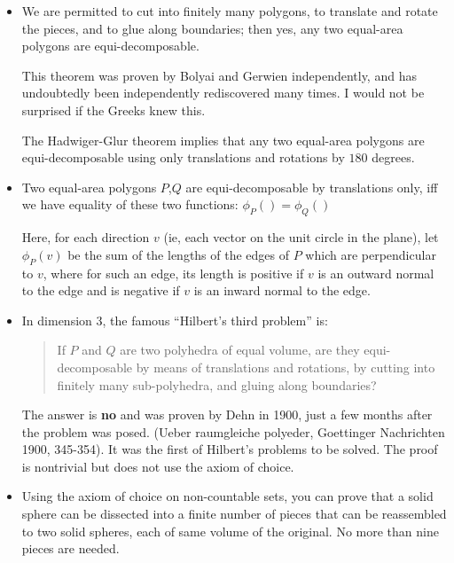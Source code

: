 \begin{itemize}
  \item We are permitted to cut into finitely many polygons, to
  translate and rotate the pieces, and to glue along boundaries; then
  yes, any two equal-area polygons are equi-decomposable.

  This theorem was proven by Bolyai and Gerwien independently, and has
  undoubtedly been independently rediscovered many times.  I would not
  be surprised if the Greeks knew this.

  The Hadwiger-Glur theorem implies that any two equal-area polygons are
  equi-decomposable using only translations and rotations by $180$
  degrees.

  \item
  \begin{teo}
    Two equal-area polygons $P$,$Q$ are equi-decomposable by
    translations only, iff we have equality of these two functions:
    $\phi_P() = \phi_Q()$
  \end{teo}
  Here, for each direction $v$ (ie, each vector on the unit circle in
  the plane), let $\phi_P(v)$ be the sum of the lengths of the edges of
  $P$ which are perpendicular to $v$, where for such an edge, its length
  is positive if $v$ is an outward normal to the edge and is negative if
  $v$ is an inward normal to the edge.


  \item In dimension 3, the famous ``Hilbert's third problem'' is:
  \begin{quote}
    If $P$ and $Q$ are two polyhedra of equal volume, are they
    equi-decomposable by means of translations and rotations, by cutting
    into finitely many sub-polyhedra, and gluing along boundaries?
  \end{quote}

  The answer is {\bf no} and was proven by Dehn in 1900, just a few
  months after the problem was posed. (Ueber raumgleiche polyeder,
  Goettinger Nachrichten 1900, 345-354). It was the first of Hilbert's
  problems to be solved. The proof is nontrivial but does not use the
  axiom of choice.

  \Ref



  \item Using the axiom of choice on non-countable sets, you can prove
  that a solid sphere can be dissected into a finite number of pieces
  that can be reassembled to two solid spheres, each of same volume of
  the original. No more than nine pieces are needed.


\end{itemize}
